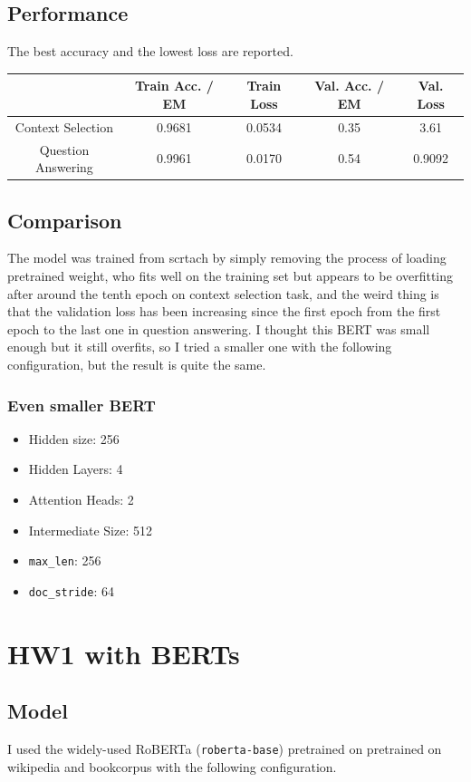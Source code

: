 \documentclass{homeworg}
\begin{document}
\subsection{Performance}
The best accuracy and the lowest loss are reported. \\
\begin{tabular}{c|c|c|c|c}
& Train Acc. / EM & Train Loss & Val. Acc. / EM & Val. Loss \\ 
\hline Context Selection & 0.9681 & 0.0534 & 0.35& 3.61 \\
\hline Question Answering & 0.9961 & 0.0170 & 0.54 & 0.9092 
\end{tabular}
\subsection{Comparison}
The model was trained from scrtach by simply removing the process of loading pretrained weight, who fits well on the training set but appears to be overfitting after around the tenth epoch on context selection task, and the weird thing is that the validation loss has been increasing since the first epoch from the first epoch to the last one in question answering. I thought this BERT was small enough but it still overfits, so I tried a smaller one with the following configuration, but the result is quite the same. 
\subsubsection{Even smaller BERT}
\begin{itemize}
    \item Hidden size: 256
    \item Hidden Layers: 4
    \item Attention Heads: 2
    \item Intermediate Size: 512
    \item \texttt{max\_len}: 256
    \item \texttt{doc\_stride}: 64
\end{itemize}
\newpage
\section{HW1 with BERTs}
\subsection{Model}
I used the widely-used RoBERTa (\texttt{roberta-base}) pretrained on pretrained on wikipedia and bookcorpus with the following configuration.
\end{document}
